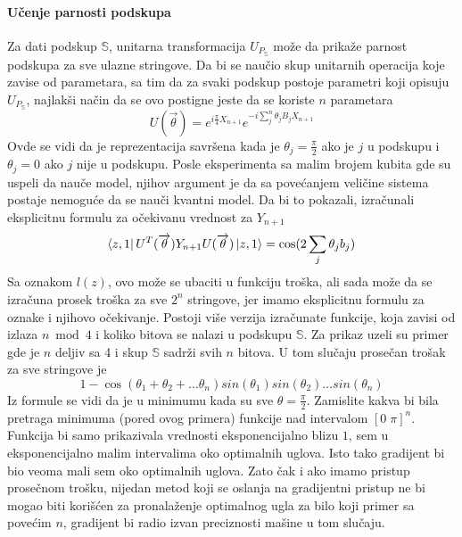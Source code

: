 \documentclass[12pt, letterpaper, oneside]{article}
\begin{document}
\paragraph{Učenje parnosti podskupa}
Za dati podskup $\mathbb{S}$, unitarna transformacija $U_{P_\mathbb{S}}$ može da prikaže parnost podskupa za sve ulazne stringove.
Da bi se naučio skup unitarnih operacija koje zavise od parametara, sa tim da za svaki podskup postoje parametri koji opisuju $U_{P_\mathbb{S}}$,
najlakši način da se ovo postigne jeste da se koriste $n$ parametara
\[
    U(\overrightarrow{\theta}) = e^{i\frac{\pi}{4}X_{n+1}}e^{-i\sum_j^n \theta_jB_jX_{n+1}}
\]
Ovde se vidi da je reprezentacija savršena kada je $\theta_j = \frac{\pi}{2}$ ako je $j$ u podskupu i $\theta_j = 0$ ako $j$ nije u podskupu.
Posle eksperimenta sa malim brojem kubita gde su uspeli da nauče model, njihov argument je da sa povećanjem veličine sistema postaje nemoguće da se nauči kvantni model.
Da bi to pokazali, izračunali eksplicitnu formulu za očekivanu vrednost za $Y_{n+1}$
\[
    \bra{z,1}U^T(\overrightarrow{\theta})Y_{n+1}U(\overrightarrow{\theta})\Ket{z,1} = \cos(2\sum_j\theta_jb_j)
\]
Sa oznakom $l(z)$, ovo može se ubaciti u funkciju troška, ali sada može da se izračuna prosek
troška za sve $2^n$ stringove, jer imamo eksplicitnu formulu za oznake i njihovo očekivanje.
Postoji više verzija izračunate funkcije, koja zavisi od izlaza $n \bmod 4$ i koliko bitova se nalazi u podskupu $\mathbb{S}$.
Za prikaz uzeli su primer gde je $n$ deljiv sa 4 i skup $\mathbb{S}$ sadrži svih $n$ bitova.
U tom slučaju prosečan trošak za sve stringove je 
\[
    1 - \cos(\theta_1 + \theta_2 + \dots \theta_n)sin(\theta_1)sin(\theta_2) \dots sin(\theta_n)
\]
Iz formule se vidi da je u minimumu kada su sve $\theta=\frac{\pi}{2}$. Zamislite kakva bi bila pretraga minimuma (pored ovog primera) funkcije
nad intervalom $[0\;\pi]^n$. Funkcija bi samo prikazivala vrednosti eksponencijalno blizu $1$, sem u eksponencijalno malim intervalima oko optimalnih uglova.
Isto tako gradijent bi bio veoma mali sem oko optimalnih uglova. Zato čak i ako imamo pristup prosečnom trošku, nijedan metod koji se oslanja na gradijentni pristup
ne bi mogao biti korišćen za pronalaženje optimalnog ugla za bilo koji primer sa povećim $n$, gradijent bi radio izvan preciznosti mašine u tom slučaju.
\end{document}
